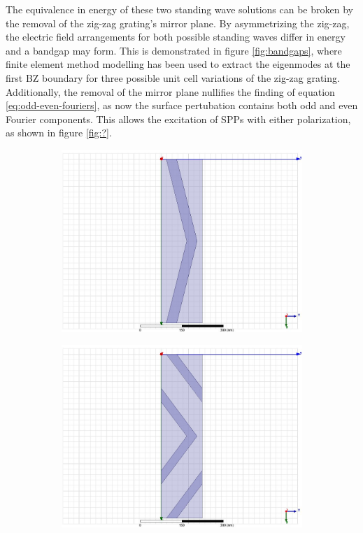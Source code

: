 \documentclass[oneside,11pt,book]{book}
\begin{document}
The equivalence in energy of these two standing wave solutions can be broken by the removal of the zig-zag grating's mirror plane. By asymmetrizing the zig-zag, the electric field arrangements for both possible standing waves differ in energy and a bandgap may form. This is demonstrated in figure \ref{fig:bandgaps}, where finite element method modelling has been used to extract the eigenmodes at the first BZ boundary for three possible unit cell variations of the zig-zag grating. 
Additionally, the removal of the mirror plane nullifies the finding of equation \ref{eq:odd-even-fouriers}, as now the surface pertubation contains both odd and even Fourier components. This allows the excitation of  SPPs with either polarization, as shown in figure \ref{fig:?}. 
\begin{figure}
\centering
\begin{subfigure}[b]{0.3\linewidth}
\centering\includegraphics[width=\linewidth]{temp-bandgaps/noOffset.jpg}
\caption{}
\end{subfigure}
\begin{subfigure}[b]{0.3\linewidth}
\centering\includegraphics[width=\linewidth]{temp-bandgaps/150yOffset.jpg}

\end{subfigure}
\end{figure}
\end{document}
